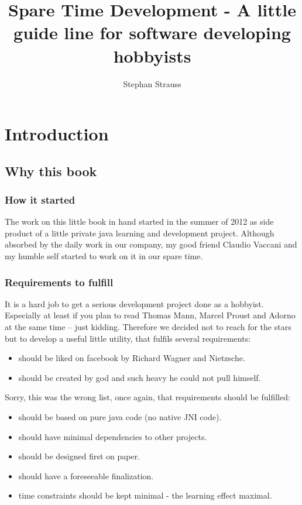 \documentclass[a4paper]{book}
\author{Stephan Strauss}
\begin{document}
    \title{Spare Time Development - A little guide line for software developing hobbyists}
    \maketitle
    
\part{Introduction}

\chapter{Why this book}

\section{How it started}

The work on this little book in hand started in the summer of 2012 as side product of a little private java learning and development project. Although absorbed by the daily work in our company, my good friend Claudio Vaccani and my humble self started to work on it in our spare time. 

\section[Requirements]{Requirements to fulfill}

It is a hard job to get a serious development project done as a hobbyist. Especially at least if you plan to read Thomas Mann, Marcel Proust and Adorno at the same time -- just kidding. Therefore we decided not to reach for the stars but to develop a useful little utility, that fulfils several requirements:


\begin{itemize}
\item should be liked on facebook by Richard Wagner and Nietzsche.
\item should be created by god and such heavy he could not pull himself. 
\end{itemize}
Sorry, this was the wrong list, once again, that requirements should be fulfilled:


\begin{itemize}
\item should be based on pure java code (no native JNI code).
\item should have minimal dependencies to other projects. 
\item should be designed first on paper. 
\item should have a foreseeable finalization.
\item time constraints should be kept minimal - the learning effect maximal. 
\end{itemize}
\end{document}
